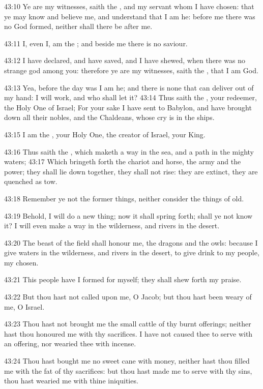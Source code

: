 43:10 Ye are my witnesses, saith the \LORD, and my servant whom I have
chosen: that ye may know and believe me, and understand that I am he:
before me there was no God formed, neither shall there be after me.

43:11 I, even I, am the \LORD; and beside me there is no saviour.

43:12 I have declared, and have saved, and I have shewed, when there
was no strange god among you: therefore ye are my witnesses, saith the
\LORD, that I am God.

43:13 Yea, before the day was I am he; and there is none that can
deliver out of my hand: I will work, and who shall let it?  43:14 Thus
saith the \LORD, your redeemer, the Holy One of Israel; For your sake I
have sent to Babylon, and have brought down all their nobles, and the
Chaldeans, whose cry is in the ships.

43:15 I am the \LORD, your Holy One, the creator of Israel, your King.

43:16 Thus saith the \LORD, which maketh a way in the sea, and a path
in the mighty waters; 43:17 Which bringeth forth the chariot and
horse, the army and the power; they shall lie down together, they
shall not rise: they are extinct, they are quenched as tow.

43:18 Remember ye not the former things, neither consider the things
of old.

43:19 Behold, I will do a new thing; now it shall spring forth; shall
ye not know it? I will even make a way in the wilderness, and rivers
in the desert.

43:20 The beast of the field shall honour me, the dragons and the
owls: because I give waters in the wilderness, and rivers in the
desert, to give drink to my people, my chosen.

43:21 This people have I formed for myself; they shall shew forth my
praise.

43:22 But thou hast not called upon me, O Jacob; but thou hast been
weary of me, O Israel.

43:23 Thou hast not brought me the small cattle of thy burnt
offerings; neither hast thou honoured me with thy sacrifices. I have
not caused thee to serve with an offering, nor wearied thee with
incense.

43:24 Thou hast bought me no sweet cane with money, neither hast thou
filled me with the fat of thy sacrifices: but thou hast made me to
serve with thy sins, thou hast wearied me with thine iniquities.

